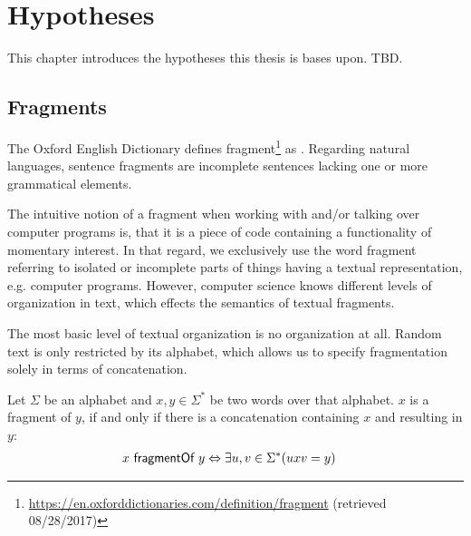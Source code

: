\chapter{Hypotheses}
\label{chapter:Hypotheses}
This chapter introduces the hypotheses this thesis is bases upon.
TBD.

\section{Fragments}
\label{section:Fragments}
The Oxford English  Dictionary defines fragment\footnote{\url{https://en.oxforddictionaries.com/definition/fragment} (retrieved 08/28/2017)} as .
Regarding natural languages, sentence fragments are incomplete sentences lacking one or more grammatical elements. 

The intuitive notion of a fragment when working with and/or talking over computer programs is, that it is a piece of code containing a functionality of momentary interest.
In that regard, we exclusively use the word fragment referring to isolated or incomplete parts of things having a textual representation, e.g. computer programs.
However, computer science knows different levels of organization in text, which effects the semantics of textual fragments.

The most basic level of textual organization is no organization at all.
Random text is only restricted by its alphabet, which allows us to specify fragmentation solely in terms of concatenation.

\begin{definition}
\label{definition:FragmentsOverAlphabets}
Let $\Sigma$ be an alphabet and $x,y \in \Sigma^\ast$ be two words over that alphabet.
$x$ is a fragment of $y$, if and only if there is a concatenation containing $x$ and resulting in $y$:
\begin{align}
&x ~\textsf{fragmentOf}~ y
\Leftrightarrow
\exists u,v \in \Sigma^\ast (u x v = y)
\end{align}
\end{definition}

